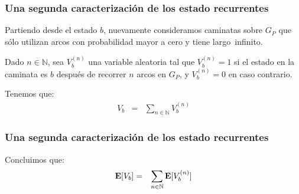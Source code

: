 \begin{frame}
\frametitle{Una segunda caracterización de los estado recurrentes}
{\footnotesize

Partiendo desde el estado $b$,  nuevamente consideramos caminatas sobre $G_P$ que sólo utilizan arcos con probabilidad mayor a cero y tiene largo~infinito.


Dado $n \in \mathbb{N}$, sea $V_b^{(n)}$ una variable aleatoria tal que $V_b^{(n)} = 1$ si el estado en la caminata es $b$ después de recorrer $n$ arcos en $G_P$, y $V_b^{(n)} = 0$ en caso contrario.


Tenemos que:
\begin{eqnarray*}
V_b & = & \sum_{n \in \mathbb{N}} V_b^{(n)}
\end{eqnarray*}



}

\end{frame}


\begin{frame}
\frametitle{Una segunda caracterización de los estado recurrentes}
{\footnotesize

Concluimos que:
\begin{eqnarray*}
{\rm {\bf E}}[V_b] & = & \sum_{n \in \mathbb{N}} {\rm {\bf E}}[V_b^{(n)}]
\end{eqnarray*}





}

\end{frame}


